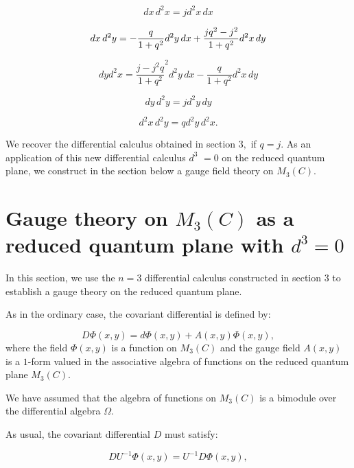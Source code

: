 \documentclass[a4paper,12pt,thmsa]{article}
\begin{document}
\begin{equation}
dx\, d^{2}x=jd^{2}x\, dx
\end{equation}

\begin{equation}
dx\, d^{2}y=-\frac{q}{1+q^{2}}d^{2}y\, dx+\frac{jq^{2}-j^{2}}{%
1+q^{2}}d^{2}x\, dy
\end{equation}

\begin{equation}
dyd^{2}x=\frac{j-j^{2}q}{1+q^{2}}^{2}d^{2}y\, dx-\frac{q}{1+q^{2}}d^{2}x%
\, dy
\end{equation}

\begin{equation}
dy\, d^{2}y=jd^{2}y\, dy
\end{equation}

\begin{equation}
d^2x\, d^2y=qd^2y\, d^2x.
\end{equation}

We recover the differential calculus obtained in section $3,$ if $q=j$. As
an application of this new differential calculus $d^3$ $=0$ on the reduced
quantum plane, we construct in the section below a gauge field theory on $%
M_3(C).$

\section{Gauge theory on $M_3(C)$ as a reduced quantum plane with $d^3=0$}

In this section, we use the $n=3$ differential calculus constructed in
section $3$ to establish a gauge theory on the reduced quantum plane.

As in the ordinary case, the covariant differential is defined by:

\begin{equation}
D\Phi (x,y)=d\Phi (x,y)+A(x,y)\Phi (x,y),
\end{equation}
where the field $\Phi (x,y)$ is a function on $M_3(C)$ and the gauge field $%
A(x,y)$ is a $1$-form valued in the associative algebra of functions on the
reduced quantum plane $M_3(C)$.

We have assumed that the algebra of functions on $M_3(C)$ is a bimodule over
the differential algebra $\Omega .$

As usual, the covariant differential $D$ must satisfy:

\begin{equation}
DU^{-1}\Phi (x,y)=U^{-1}D\Phi (x,y),
\end{equation}
\end{document}
